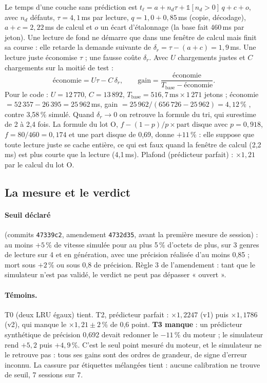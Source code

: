 Le temps d'une couche sans prédiction est $t_\ell = a + n_d\tau + \mathbb{1}[n_d > 0]\,q + c + o$, avec $n_d$ défauts, $\tau = 4{,}1$\,ms par lecture, $q = 1{,}0 + 0{,}85$\,ms (copie, décodage), $a + c = 2{,}22$\,ms de calcul et $o$ un écart d'étalonnage (la base fait 460\,ms par jeton). Une lecture de fond ne démarre que dans une fenêtre de calcul mais finit sa course : elle retarde la demande suivante de $\delta_r = \tau - (a + c) = 1{,}9$\,ms. Une lecture juste économise $\tau$ ; une fausse coûte $\delta_r$. Avec $U$ chargements justes et $C$ chargements sur la moitié de test :
\begin{equation}\label{t3mim:eq:p4-gain}
\text{économie} = U\tau - C\,\delta_r, \qquad \text{gain} = \frac{\text{économie}}{T_{\text{base}} - \text{économie}} .
\end{equation}
Pour le code : $U = 12\,770$, $C = 13\,892$, $T_{\text{base}} = 516{,}7\,\mathrm{ms} \times 1\,271$ jetons ; économie $= 52\,357 - 26\,395 = 25\,962$\,ms, gain $= 25\,962 / (656\,726 - 25\,962) = 4{,}12\,\%$ \calc, contre 3,58\,\% simulé. Quand $\delta_r \to 0$ on retrouve la formule du tri, qui surestime de 2 à 2,4 fois. La formule du lot O, $f - (1-p)/p \times \text{part disque}$ avec $p = 0{,}918$, $f = 80/460 = 0{,}174$ et une part disque de 0,69, donne $+11\,\%$ : elle suppose que toute lecture juste se cache entière, ce qui est faux quand la fenêtre de calcul (2,2\,ms) est plus courte que la lecture (4,1\,ms). Plafond (prédicteur parfait) : $\times 1{,}21$ par le calcul du lot O.

\subsection{La mesure et le verdict}\label{t3mim:sec:p4-verdict}

\paragraph{Seuil déclaré} (commits \texttt{47339c2}, amendement \texttt{4732d35}, avant la première mesure de session) : au moins $+5\,\%$ de vitesse simulée pour au plus 5\,\% d'octets de plus, sur 3 genres de lecture sur 4 et en génération, avec une précision réalisée d'au moins 0,85 ; mort sous $+2\,\%$ ou sous 0,8 de précision. Règle 3 de l'amendement : tant que le simulateur n'est pas validé, le verdict ne peut pas dépasser « ouvert ».

\paragraph{Témoins.} T0 (deux LRU égaux) tient. T2, prédicteur parfait : $\times 1{,}2247$ (v1) puis $\times 1{,}1786$ (v2), qui manque le $\times 1{,}21 \pm 2\,\%$ de 0,6 point. \textbf{T3 manque} : un prédicteur synthétique de précision 0,692 devait redonner le $-11\,\%$ du moteur ; le simulateur rend $+5{,}2$ puis $+4{,}9\,\%$. C'est le seul point mesuré du moteur, et le simulateur ne le retrouve pas : tous ses gains sont des ordres de grandeur, de signe d'erreur inconnu. La cassure par étiquettes mélangées tient : aucune calibration ne trouve de seuil, 7 sessions sur 7.

